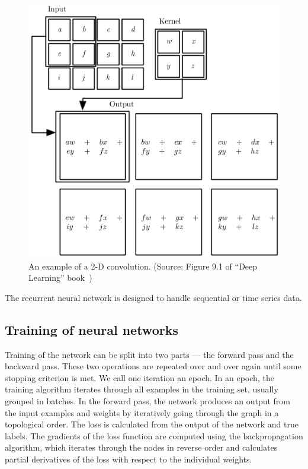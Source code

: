 \begin{figure}
    \centering
    \includegraphics[scale=0.25]{img/convolution.png}
    \caption{An example of a 2-D convolution. (Source: Figure 9.1 of ``Deep Learning'' book~\cite{Goodfellow-et-al-2016})}
    \label{fig:conv}
\end{figure}

 The recurrent neural network is designed to handle sequential or time series data.


\subsection{Training of neural networks}
Training of the network can be split into two parts --- the forward pass and the backward pass. These two operations are repeated over and over again until some stopping criterion is met. We call one iteration an epoch. In an epoch, the training algorithm iterates through all examples in the training set, usually grouped in batches. In the forward pass, the network produces an output from the input examples and weights by iteratively going through the graph in a topological order. The loss is calculated from the output of the network and true labels. The gradients of the loss function are computed using the backpropagation algorithm, which iterates through the nodes in reverse order and calculates partial derivatives of the loss with respect to the individual weights.

